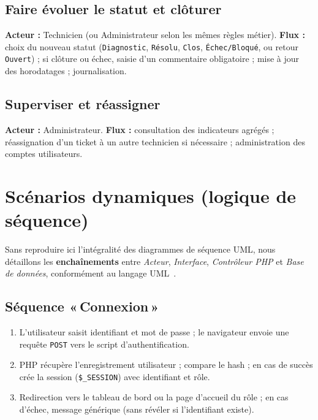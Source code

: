 \subsection{Faire évoluer le statut et clôturer}
\textbf{Acteur :} Technicien (ou Administrateur selon les mêmes règles métier). \textbf{Flux :}
choix du nouveau statut (\texttt{Diagnostic}, \texttt{Résolu}, \texttt{Clos},
\texttt{Échec/Bloqué}, ou retour \texttt{Ouvert}) ; si clôture ou échec, saisie d'un commentaire
obligatoire ; mise à jour des horodatages ; journalisation.

\subsection{Superviser et réassigner}
\textbf{Acteur :} Administrateur. \textbf{Flux :} consultation des indicateurs agrégés ;
réassignation d'un ticket à un autre technicien si nécessaire ; administration des comptes
utilisateurs.

\section{Scénarios dynamiques (logique de séquence)}
Sans reproduire ici l'intégralité des diagrammes de séquence UML, nous détaillons les
\textbf{enchaînements} entre \textit{Acteur}, \textit{Interface}, \textit{Contrôleur PHP} et
\textit{Base de données}, conformément au langage UML~\cite{roques2006}.

\subsection{Séquence «\,Connexion\,»}
\begin{enumerate}
    \item L'utilisateur saisit identifiant et mot de passe ; le navigateur envoie une requête
    \texttt{POST} vers le script d'authentification.
    \item PHP récupère l'enregistrement utilisateur ; compare le hash ; en cas de succès crée
    la session (\texttt{\$\_SESSION}) avec identifiant et rôle.
    \item Redirection vers le tableau de bord ou la page d'accueil du rôle ; en cas d'échec,
    message générique (sans révéler si l'identifiant existe).
\end{enumerate}

